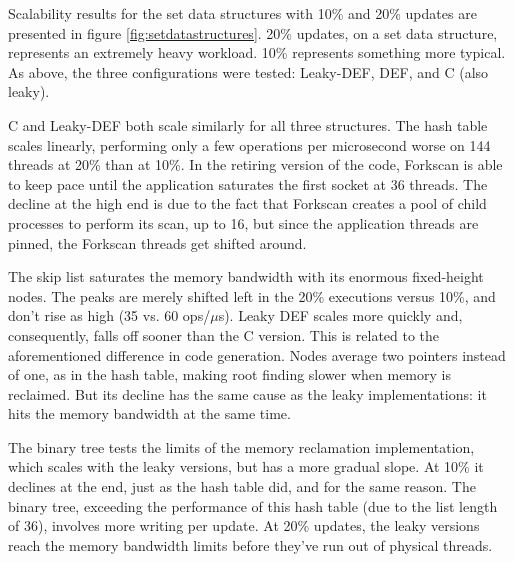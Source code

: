 Scalability results for the set data structures with 10\% and 20\% updates are presented in figure \ref{fig:setdatastructures}.  20\% updates, on a set data structure, represents an extremely heavy workload.  10\% represents something more typical.  As above, the three configurations were tested: Leaky-DEF, DEF, and C (also leaky).


C and Leaky-DEF both scale similarly for all three structures.  The hash table scales linearly, performing only a few operations per microsecond worse on 144 threads at 20\% than at 10\%.  In the retiring version of the code, Forkscan is able to keep pace until the application saturates the first socket at 36 threads.  The decline at the high end is due to the fact that Forkscan creates a pool of child processes to perform its scan, up to 16, but since the application threads are pinned, the Forkscan threads get shifted around.

The skip list saturates the memory bandwidth with its enormous fixed-height nodes.  The peaks are merely shifted left in the 20\% executions versus 10\%, and don't rise as high (35 vs. 60 ops/$\mu$s).  Leaky DEF scales more quickly and, consequently, falls off sooner than the C version.  This is related to the aforementioned difference in code generation.  Nodes average two pointers instead of one, as in the hash table, making root finding slower when memory is reclaimed.  But its decline has the same cause as the leaky implementations: it hits the memory bandwidth at the same time.

The binary tree tests the limits of the memory reclamation implementation, which scales with the leaky versions, but has a more gradual slope.  At 10\% it declines at the end, just as the hash table did, and for the same reason.  The binary tree, exceeding the performance of this hash table (due to the list length of 36), involves more writing per update.  At 20\% updates, the leaky versions reach the memory bandwidth limits before they've run out of physical threads.

